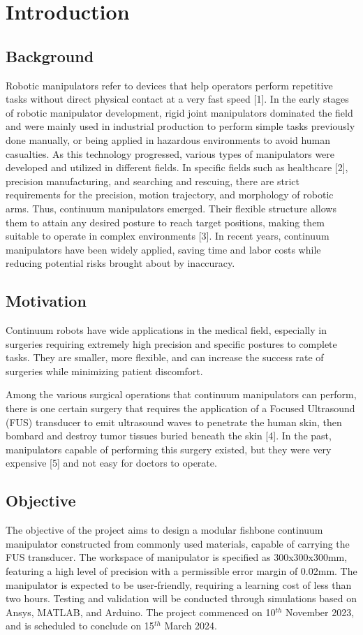 \section{Introduction} 
\subsection{Background}
Robotic manipulators refer to devices that help operators perform repetitive tasks without direct physical contact at a very 
fast speed [1]. In the early stages of robotic manipulator development, rigid joint manipulators dominated the field and were 
mainly used in industrial production to perform simple tasks previously done manually, or being applied in hazardous environments 
to avoid human casualties. As this technology progressed, various types of manipulators were developed and utilized in different 
fields. In specific fields such as healthcare [2], precision manufacturing, and searching and rescuing, there are strict 
requirements for the precision, motion trajectory, and morphology of robotic arms. Thus, continuum manipulators emerged. 
Their flexible structure allows them to attain any desired posture to reach target positions, making them suitable to operate 
in complex environments [3]. In recent years, continuum manipulators have been widely applied, saving time and labor costs while 
reducing potential risks brought about by inaccuracy. 

\subsection{Motivation}
Continuum robots have wide applications in the medical field, especially in surgeries requiring extremely high precision and 
specific postures to complete tasks. They are smaller, more flexible, and can increase the success rate of surgeries while 
minimizing patient discomfort. 

Among the various surgical operations that continuum manipulators can perform, there is one certain surgery that requires the 
application of a Focused Ultrasound (FUS) transducer to emit ultrasound waves to penetrate the human skin, then bombard and 
destroy tumor tissues buried beneath the skin [4]. In the past, manipulators capable of performing this surgery existed, but 
they were very expensive [5] and not easy for doctors to operate.

\subsection{Objective}
The objective of the project aims to design a modular fishbone continuum manipulator constructed from commonly used materials, 
capable of carrying the FUS transducer. The workspace of manipulator is specified as 300x300x300mm,  featuring a high level 
of precision with a permissible error margin of 0.02mm. The manipulator is expected to be user-friendly, requiring a learning 
cost of less than two hours. Testing and validation will be conducted through simulations based on Ansys, MATLAB, and Arduino. 
The project commenced on 10$^{th}$ November 2023, and is scheduled to conclude on 15$^{th}$ March 2024.


\newpage